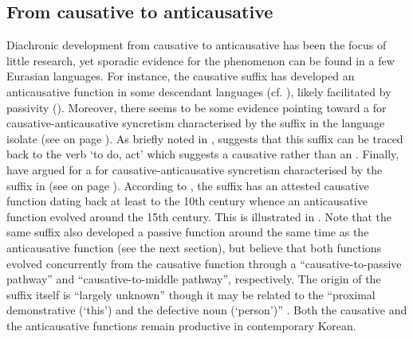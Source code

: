 \subsection{From causative to anticausative} \label{diachrony:caus2antc}
Diachronic development from causative to anticausative has been the focus of little research, yet sporadic evidence for the phenomenon can be found in a few Eurasian languages. For instance, the  causative suffix  has developed an anticausative function in some descendant languages (cf.  ), likely facilitated by passivity (). Moreover, there seems to be some evidence pointing toward a  for causative-anticausative syncretism characterised by the suffix  in the language isolate  (see  on page \pageref{tab:ch4:caus-antc}). As briefly noted in , \cite{nonno:2015} suggests that this suffix can be traced back to the verb  ‘to do, act’ which suggests a causative rather than an . Finally, \cite{yap:ahn:2019} have argued for a  for causative-anticausative syncretism characterised by the suffix  in  (see  on page \pageref{tab:ch5:caus-pass-antc}). According to \cite[3ff., 9f.]{yap:ahn:2019}, the  suffix  has an attested causative function dating back at least to the 10th century whence an anticausative function evolved around the 15th century. This  is illustrated in . Note that the same suffix also developed a passive function around the same time as the anticausative function (see the next section), but \cite[16ff.]{yap:ahn:2019} believe that both functions evolved concurrently from the causative function through a “causative-to-passive pathway” and “causative-to-middle pathway”, respectively. The origin of the suffix  itself is “largely unknown” though it may be related to the “proximal demonstrative  (‘this’) and the defective noun  (‘person’)” \citep[20]{yap:ahn:2019}. Both the causative and the anticausative functions remain productive in contemporary Korean. 

